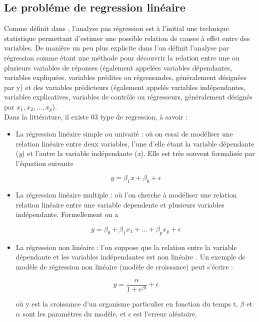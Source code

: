 \documentclass[12pt,a4paper]{article}
\begin{document}
\subsection{Le probléme de regression linéaire}

Comme définit dans \cite{ref2}, l'analyse pas régression est à l'initial une technique statistique permettant d'estimer une possible relation de causes à effet entre des variables. De manière  un peu plus explicite dans \cite{ref4} l'on définit l'analyse par régression comme étant une méthode pour découvrir la relation entre une ou plusieurs variables de réponses (également appelées variables dépendantes, variables expliquées, variables prédites ou régressandes, généralement désignées par y) et des variables prédicteurs (également appelés variables indépendantes, variables explicatives, variables de contrôle ou régresseurs, généralement désignés par $x_{1},x_{2},...,x_{p}$).\\

Dans la littérature, il existe 03 type de regression, à savoir : 

\begin{itemize}
\item La régression linéaire simple ou univarié : où on essai de modéliser une relation linéaire entre deux variables, l'une d'elle étant la variable dépendante (\textit{y}) et l'autre la variable indépendante (\textit{x}). Elle est très souvent formalisée par l'équation suivante
\begin{large}
\begin{equation}
y = \beta_{1}x + \beta_{0} + \epsilon
\end{equation}
\end{large}

\item La régression linéaire multiple : où l'on cherche à modéliser une relation relation linéaire entre une variable dependente et plusieurs variables indépendante. Formellement on a 

\begin{large}
\begin{equation}
y = \beta_{0} + \beta_{1}x_{1} + ... + \beta_{p}x_{p} + \epsilon
\end{equation}
\end{large}

\item La régression non linéaire  : l'on suppose que la relation entre la variable dépendante et les variables indépendantes est
non linéaire . Un exemple de modèle de régression non linéaire (modèle de croissance) peut s'écrire : 

\begin{large}
\begin{equation}
y = \frac{\alpha}{1+e^{\beta t}} + \epsilon
\end{equation}
\end{large}

où y est la croissance d'un organisme particulier en fonction du temps t, $\beta$ et $\alpha$ sont les paramètres du modèle, et $\epsilon$ est l'erreur aléatoire. \\

\end{itemize}
\end{document}

